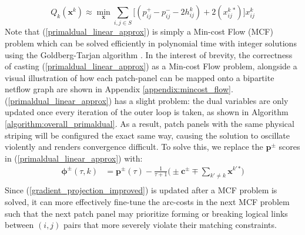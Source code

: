 \documentclass[sigconf]{acmart}
\theoremstyle{definition}
\begin{document}
\begin{appendices}
\begin{equation}
    Q_{k}(\mathbf{x}^k) \approx \min_{\mathbf{x}} \sum_{i, j \in S} \big[(p_{ij}^+ - p_{ij}^- - 2h_{ij}^k)+ 2({x_{ij}^{k}}{}^{*})\big] x_{ij}^k \label{primaldual_linear_approx}
\end{equation}
Note that (\ref{primaldual_linear_approx}) is simply a Min-cost Flow (MCF) problem which can be solved efficiently in polynomial time with integer solutions using the Goldberg-Tarjan algorithm \cite{bunnagel1998efficient}. In the interest of brevity, the correctness of casting (\ref{primaldual_linear_approx}) as a Min-cost Flow problem, alongside a visual illustration of how each patch-panel can be mapped onto a bipartite netflow graph are shown in Appendix \ref{appendix:mincost_flow}. (\ref{primaldual_linear_approx}) has a slight problem: the dual variables are only updated once every iteration of the outer loop is taken, as shown in Algorithm \ref{algorithm:overall_primaldual}. As a result, patch panels with the same physical striping will be configured the exact same way, causing the solution to oscillate violently and renders convergence difficult. To solve this, we replace the $\mathbf{p}^\pm$ scores in (\ref{primaldual_linear_approx}) with:
\begin{equation}
\begin{aligned}
    \boldsymbol{\phi}^{\pm}(\tau, k) &= \mathbf{p}^{\pm}(\tau) - \frac{1}{\tau + 1} \big(\pm \mathbf{c}^{\pm} \mp  \sum_{k' \neq k}\mathbf{x}^{k'}{}^* \big)\\
\end{aligned}\label{gradient_projection_improved}
\end{equation}
Since (\ref{gradient_projection_improved}) is updated after a MCF problem is solved, it can more effectively fine-tune the arc-costs in the next MCF problem such that the next patch panel may prioritize forming or breaking logical links between $(i, j)$ pairs that more severely violate their matching constraints.

\end{appendices}
\end{document}
